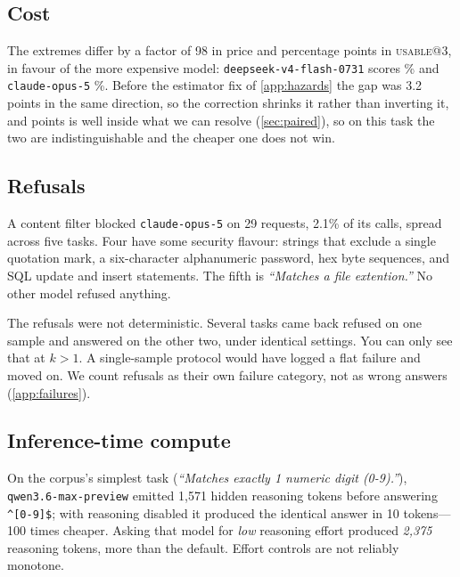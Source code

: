 \documentclass[11pt]{article}
\newcommand{\usable}{\textsc{usable}}
\begin{document}
\subsection{Cost}
\label{sec:cost}

\begin{table}[htbp]
\centering
\small

\caption{Cost per \emph{request}, measured from per-request billing returned
by the serving layer rather than estimated from list prices. A task costs
three of these at $n=3$: \texttt{claude-opus-5} at $2514.2 \times 10^{-6}$
over 1{,}350 requests gives the \$3.39 total.}
\label{tab:cost}
\end{table}

The extremes differ by a factor of 98 in price and \costgap{} percentage
points in \usable{}@3, in favour of the more expensive model:
\texttt{deepseek-v4-flash-0731} scores \cheapusable{}\% and
\texttt{claude-opus-5} \dearusable{}\%. Before the estimator fix of
\cref{app:hazards} the gap was 3.2 points in the same direction, so the
correction shrinks it rather than inverting it, and \costgap{} points is well
inside what we can resolve (\cref{sec:paired}), so on this task the two are
indistinguishable and the cheaper one does not win.

\subsection{Refusals}

A content filter blocked \texttt{claude-opus-5} on 29 requests, 2.1\% of its
calls, spread across five tasks. Four have some security flavour: strings that
exclude a single quotation mark, a six-character alphanumeric password, hex
byte sequences, and SQL update and insert statements. The fifth is
\emph{``Matches a file extention.''} No other model refused anything.

The refusals were not deterministic. Several tasks came back refused on one
sample and answered on the other two, under identical settings. You can only
see that at $k>1$. A single-sample protocol would have logged a flat failure
and moved on. We count refusals as their own failure category, not as wrong
answers (\cref{app:failures}).

\subsection{Inference-time compute}

On the corpus's simplest task (\emph{``Matches exactly 1 numeric digit
(0-9).''}), \texttt{qwen3.6-max-preview} emitted 1{,}571 hidden reasoning
tokens before answering \texttt{\^{}[0-9]\$}; with reasoning disabled it
produced the identical answer in 10 tokens---100 times cheaper. Asking that
model for \emph{low} reasoning effort produced \emph{2{,}375} reasoning
tokens, more than the default. Effort controls are not reliably monotone.
\end{document}
